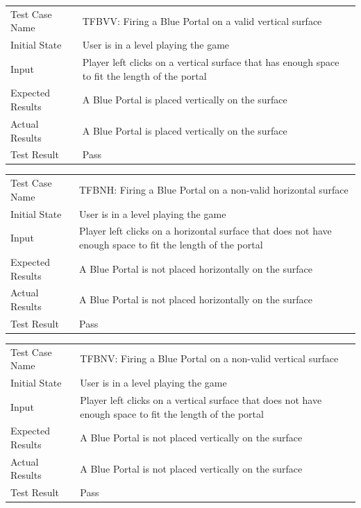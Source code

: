 \documentclass[12pt, titlepage]{article}
\begin{document}
\begin{center}
\begin{tabular}{ | l | p{10cm} | }
\hline
Test Case Name & TFBVV: Firing a Blue Portal on a valid vertical surface	\\
Initial State & User is in a level playing the game	\\
Input & Player left clicks on a vertical surface that has enough space to fit the length of the portal	\\
Expected Results & A Blue Portal is placed vertically on the surface	\\
Actual Results & A Blue Portal is placed vertically on the surface	\\
Test Result & Pass	\\
\hline
\end{tabular}
\end{center}

\begin{center}
\begin{tabular}{ | l | p{10cm} | }
\hline
Test Case Name & TFBNH: Firing a Blue Portal on a non-valid horizontal surface	\\
Initial State & User is in a level playing the game	\\
Input & Player left clicks on a horizontal surface that does not have enough space to fit the length of the portal	\\
Expected Results & A Blue Portal is not placed horizontally on the surface	\\
Actual Results & A Blue Portal is not placed horizontally on the surface	\\
Test Result & Pass	\\
\hline
\end{tabular}
\end{center}

\begin{center}
\begin{tabular}{ | l | p{10cm} | }
\hline
Test Case Name & TFBNV: Firing a Blue Portal on a non-valid vertical surface	\\
Initial State & User is in a level playing the game	\\
Input & Player left clicks on a vertical surface that does not have enough space to fit the length of the portal	\\
Expected Results & A Blue Portal is not placed vertically on the surface	\\
Actual Results & A Blue Portal is not placed vertically on the surface	\\
Test Result & Pass	\\
\hline
\end{tabular}
\end{center}
\end{document}
